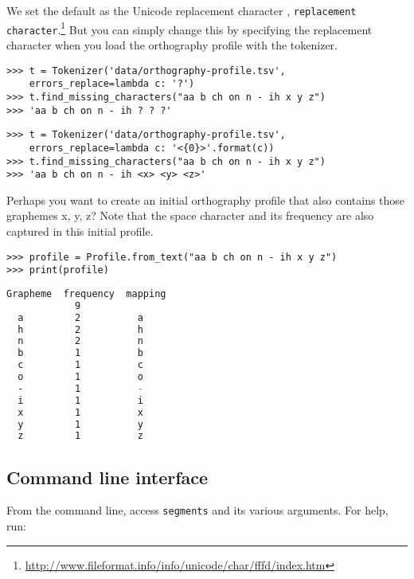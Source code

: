 \documentclass[output=inprep,
		biblatex
		]{LSP/langsci}\usepackage[]{graphicx}\usepackage[]{color}
\begin{document}
\noindent We set the default as the Unicode replacement character , \texttt{replacement character}.\footnote{\url{http://www.fileformat.info/info/unicode/char/fffd/index.htm}} But you can simply change this by specifying the replacement character when you load the orthography profile with the tokenizer.


\begin{lstlisting}
>>> t = Tokenizer('data/orthography-profile.tsv', 
	errors_replace=lambda c: '?')
>>> t.find_missing_characters("aa b ch on n - ih x y z")
>>> 'aa b ch on n - ih ? ? ?'
\end{lstlisting}

\begin{lstlisting}
>>> t = Tokenizer('data/orthography-profile.tsv', 
	errors_replace=lambda c: '<{0}>'.format(c))
>>> t.find_missing_characters("aa b ch on n - ih x y z")
>>> 'aa b ch on n - ih <x> <y> <z>'
\end{lstlisting}

\noindent Perhaps you want to create an initial orthography profile that also contains those graphemes x, y, z? Note that the space character and its frequency are also captured in this initial profile.

\begin{lstlisting}
>>> profile = Profile.from_text("aa b ch on n - ih x y z")
>>> print(profile)
\end{lstlisting}


\begin{lstlisting}[language=bash,texcl=true]
  Grapheme  frequency  mapping
            9
  a         2          a
  h         2          h
  n         2          n
  b         1          b
  c         1          c
  o         1          o
  -         1          -
  i         1          i
  x         1          x
  y         1          y
  z         1          z
\end{lstlisting}


\subsection*{Command line interface}

From the command line, access \texttt{segments} and its 
various arguments. For help, run:
\end{document}
